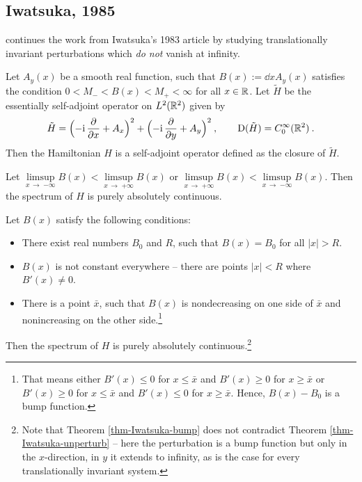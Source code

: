 \subsection{Iwatsuka, 1985}
\citet{Iwatsuka1985} continues the work from Iwatsuka's 1983 article by studying translationally invariant perturbations which \textit{do not} vanish at infinity.
\begin{defn}[Hamiltonian]
    Let $A_y(x)$ be a smooth real function, such that $B(x) := \dd{}{x} A_y(x)$ satisfies the condition $0 < M_- < B(x) < M_+ < \infty$ for all $x \in \mathbb{R}$. Let $\tilde H$ be the essentially self-adjoint operator on $L^2(\mathbb{R}^2)$ given by
    \begin{gather*}
        \tilde H
        = \Big( {-\mathrm{i}} \, \frac{\partial }{\partial x} + A_x \Big)^2
        + \Big( {-\mathrm{i}} \, \frac{\partial }{\partial y} + A_y \Big)^2
        \: , \qquad
        \mathrm{D}(\tilde H) = C_0^\infty(\mathbb{R}^2)
        \: .
    \end{gather*}
    Then the Hamiltonian $H$ is a self-adjoint operator defined as the closure of $\tilde H$.
\end{defn}
\begin{thm}
    Let $\underset{x \, \to \; {-\infty}}{\operatorname{\lim\sup}} B(x) < \underset{x \, \to \; {+\infty}}{\operatorname{\lim\sup}} B(x)$ or $\underset{x \, \to \; {+\infty}}{\operatorname{\lim\sup}} B(x) < \underset{x \, \to \; {-\infty}}{\operatorname{\lim\sup}} B(x)$. Then the spectrum of $H$ is purely absolutely continuous.
\end{thm}
\begin{thm} \label{thm-Iwatsuka-bump}
    Let $B(x)$ satisfy the following conditions:
    \begin{itemize}
        \item There exist real numbers $B_0$ and $R$, such that $B(x) = B_0$ for all $|x| > R$.
        \item $B(x)$ is not constant everywhere – there are points $|x| \!<\! R$ where $B'(x) \!\neq\! 0$.
        \item There is a point $\bar x$, such that $B(x)$ is nondecreasing on one side of $\bar x$ and nonincreasing on the other side.\footnote{That means either $B'(x)\leq 0$ for $x\leq\bar x$ and $B'(x) \geq 0$ for $x\geq\bar x$ or $B'(x)\geq 0$ for $x\leq\bar x$ and $B'(x) \leq 0$ for $x\geq\bar x$. Hence, $B(x) - B_0$ is a bump function.}
    \end{itemize}
    Then the spectrum of $H$ is purely absolutely continuous.\footnote{Note that Theorem \ref{thm-Iwatsuka-bump} does not contradict Theorem \ref{thm-Iwatsuka-unperturb} – here the perturbation is a bump function but only in the $x$-direction, in $y$ it extends to infinity, as is the case for every translationally invariant system.}
\end{thm}

